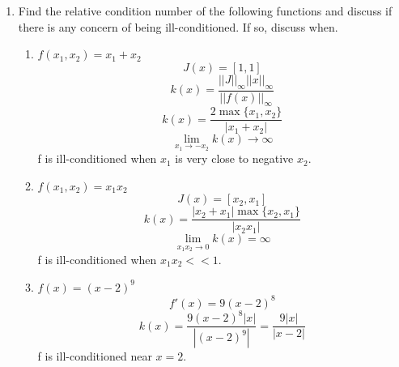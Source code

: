 \documentclass{article}
\begin{document}
\begin{enumerate}
    \item %
     Find the relative condition number of the following functions and discuss
if there is any concern of being ill-conditioned. If so, discuss when.
    \begin{enumerate}
        \item $f(x_1, x_2) = x_1 + x_2$
            \[
                J(x) = [1, 1]
            \]
            \[
                k(x) = \frac{||J||_{\infty}||x||_{\infty}}{||f(x)||_\infty}
            \]
            \[
                k(x) = \frac{2\max\{x_1, x_2\}}{|x_1 + x_2|}
            \]
            \[
                \lim_{x_1 \to -x_2} k(x) \to \infty
            \]
            f is ill-conditioned when $x_1$ is very close to negative $x_2$.

        \item $f(x_1, x_2) = x_1x_2$
            \[
                J(x) = [x_2, x_1]
            \]
            \[
                k(x) = \frac{|x_2 + x_1|\max\{x_2, x_1\}}{|x_2x_1|}
            \]  
            \[
                \lim_{x_1x_2 \to 0} k(x) =  \infty
            \]
            f is ill-conditioned when $x_1x_2 << 1$. 

        \item $f(x) = (x - 2)^9$
            \[
                f'(x) = 9(x-2)^8  
            \]
            \[
                k(x) = \frac{9(x-2)^8|x|}{|(x-2)^9|} = \frac{9|x|}{|x-2|}
            \]
            f is ill-conditioned near $x = 2$. 

    \end{enumerate}



\end{enumerate}
\end{document}
